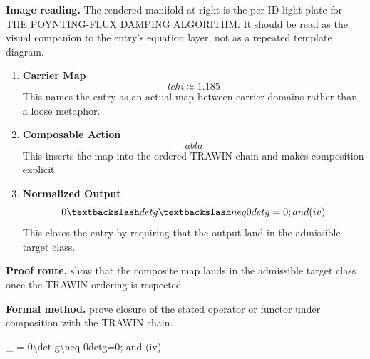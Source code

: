 \begin{samepage}
\noindent\begin{minipage}[t]{0.45\linewidth}
\vspace{0pt}
\raggedright
\scriptsize\textbf{Image reading.} The rendered manifold at right is the per-ID light plate for THE POYNTING-FLUX DAMPING ALGORITHM. It should be read as the visual companion to the entry's equation layer, not as a repeated template diagram.\par
\end{minipage}\hfill
\begin{minipage}[t]{0.53\linewidth}
\vspace*{-0.10in}
\raggedright
{}
\end{minipage}
\end{samepage}

\clearpage


\begin{enumerate}[leftmargin=1.6em,itemsep=9pt,topsep=6pt]
\item \textbf{Carrier Map}
\[
lchi\approx1.185
\]
This names the entry as an actual map between carrier domains rather than a loose metaphor.

\item \textbf{Composable Action}
\[
abla
\]
This inserts the map into the ordered TRAWIN chain and makes composition explicit.

\item \textbf{Normalized Output}
\[
0\textbackslash det g\textbackslash neq 0detg=0; and (iv)
\]
This closes the entry by requiring that the output land in the admissible target class.
\end{enumerate}

\textbf{Proof route.} show that the composite map lands in the admissible target class once the TRAWIN ordering is respected.

\textbf{Formal method.} prove closure of the stated operator or functor under composition with the TRAWIN chain.

\medskip
{}

\begin{tzpsnapshot}
\end{tzpsnapshot}

\tzpequationlinks
  { \to {}}
  {_{} = \cdots}
  {0\textbackslash det g\textbackslash neq 0detg=0; and (iv)}
